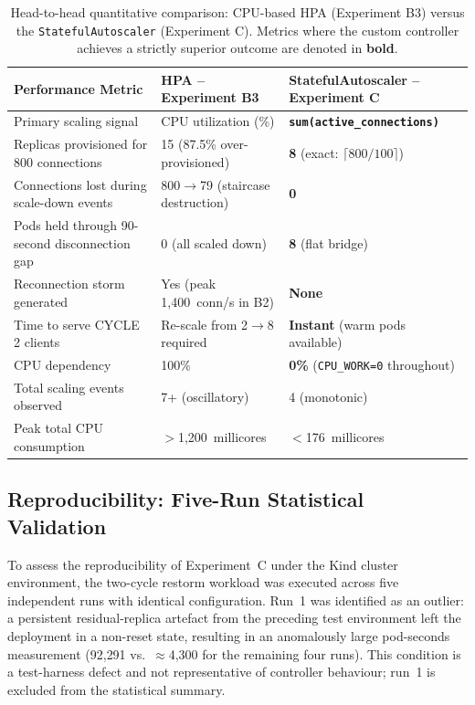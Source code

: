 \documentclass[twocolumn]{svjour3}
\begin{document}
\begin{table}[t]
\centering
\caption{Head-to-head quantitative comparison: CPU-based HPA (Experiment B3) versus the \texttt{StatefulAutoscaler} (Experiment C). Metrics where the custom controller achieves a strictly superior outcome are denoted in \textbf{bold}.}
\label{tab:head_to_head}
\begin{tabular}{@{}p{4.5cm}p{4.5cm}p{4.5cm}@{}}
\toprule
\rowcolor{gray!12}
\textbf{Performance Metric} & \textbf{HPA -- Experiment B3} & \textbf{StatefulAutoscaler -- Experiment C} \\
\midrule
Primary scaling signal & CPU utilization (\%) & \textbf{\texttt{sum(active\_connections)}} \\
Replicas provisioned for 800 connections & 15 (87.5\% over-provisioned) & \textbf{8} (exact: $\lceil800/100\rceil$) \\
Connections lost during scale-down events & 800$\rightarrow$79 (staircase destruction) & \textbf{0} \\
Pods held through 90-second disconnection gap & 0 (all scaled down) & \textbf{8} (flat bridge) \\
Reconnection storm generated & Yes (peak 1,400~conn/s in B2) & \textbf{None} \\
Time to serve CYCLE 2 clients & Re-scale from 2$\rightarrow$8 required & \textbf{Instant} (warm pods available) \\
CPU dependency & 100\% & \textbf{0\%} (\texttt{CPU\_WORK=0} throughout) \\
Total scaling events observed & 7+ (oscillatory) & 4 (monotonic) \\
Peak total CPU consumption & $>$1,200~millicores & $<$176~millicores \\
\bottomrule
\end{tabular}
\end{table}

\subsection{Reproducibility: Five-Run Statistical Validation}
\label{sec:exp_c_multi}

To assess the reproducibility of Experiment~C under the Kind cluster environment, the two-cycle restorm workload was executed across five independent runs with identical configuration.  Run~1 was identified as an outlier: a persistent residual-replica artefact from the preceding test environment left the deployment in a non-reset state, resulting in an anomalously large pod-seconds measurement (92{,}291 vs.\ $\approx$4{,}300 for the remaining four runs).  This condition is a test-harness defect and not representative of controller behaviour; run~1 is excluded from the statistical summary.
\end{document}
